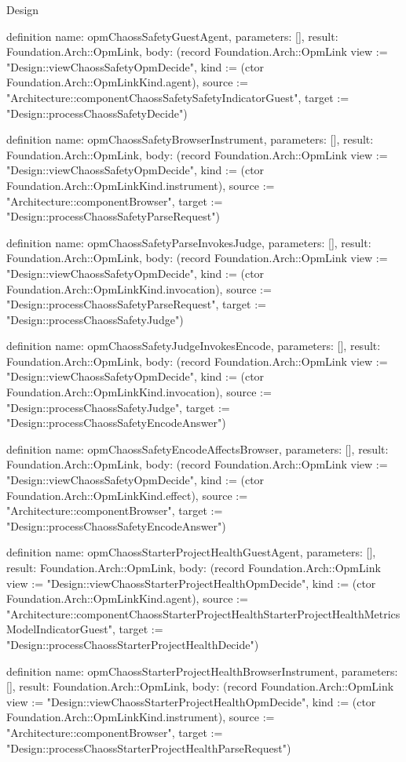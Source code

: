 \begin{lexlean}{Design}
\begin{semanticmodule}
definition{
  name: opmChaossSafetyGuestAgent,
  parameters: [],
  result: Foundation.Arch::OpmLink,
  body: (record Foundation.Arch::OpmLink {view := "Design::viewChaossSafetyOpmDecide", kind := (ctor Foundation.Arch::OpmLinkKind.agent), source := "Architecture::componentChaossSafetySafetyIndicatorGuest", target := "Design::processChaossSafetyDecide"})
}

definition{
  name: opmChaossSafetyBrowserInstrument,
  parameters: [],
  result: Foundation.Arch::OpmLink,
  body: (record Foundation.Arch::OpmLink {view := "Design::viewChaossSafetyOpmDecide", kind := (ctor Foundation.Arch::OpmLinkKind.instrument), source := "Architecture::componentBrowser", target := "Design::processChaossSafetyParseRequest"})
}

definition{
  name: opmChaossSafetyParseInvokesJudge,
  parameters: [],
  result: Foundation.Arch::OpmLink,
  body: (record Foundation.Arch::OpmLink {view := "Design::viewChaossSafetyOpmDecide", kind := (ctor Foundation.Arch::OpmLinkKind.invocation), source := "Design::processChaossSafetyParseRequest", target := "Design::processChaossSafetyJudge"})
}

definition{
  name: opmChaossSafetyJudgeInvokesEncode,
  parameters: [],
  result: Foundation.Arch::OpmLink,
  body: (record Foundation.Arch::OpmLink {view := "Design::viewChaossSafetyOpmDecide", kind := (ctor Foundation.Arch::OpmLinkKind.invocation), source := "Design::processChaossSafetyJudge", target := "Design::processChaossSafetyEncodeAnswer"})
}

definition{
  name: opmChaossSafetyEncodeAffectsBrowser,
  parameters: [],
  result: Foundation.Arch::OpmLink,
  body: (record Foundation.Arch::OpmLink {view := "Design::viewChaossSafetyOpmDecide", kind := (ctor Foundation.Arch::OpmLinkKind.effect), source := "Architecture::componentBrowser", target := "Design::processChaossSafetyEncodeAnswer"})
}

definition{
  name: opmChaossStarterProjectHealthGuestAgent,
  parameters: [],
  result: Foundation.Arch::OpmLink,
  body: (record Foundation.Arch::OpmLink {view := "Design::viewChaossStarterProjectHealthOpmDecide", kind := (ctor Foundation.Arch::OpmLinkKind.agent), source := "Architecture::componentChaossStarterProjectHealthStarterProjectHealthMetricsModelIndicatorGuest", target := "Design::processChaossStarterProjectHealthDecide"})
}

definition{
  name: opmChaossStarterProjectHealthBrowserInstrument,
  parameters: [],
  result: Foundation.Arch::OpmLink,
  body: (record Foundation.Arch::OpmLink {view := "Design::viewChaossStarterProjectHealthOpmDecide", kind := (ctor Foundation.Arch::OpmLinkKind.instrument), source := "Architecture::componentBrowser", target := "Design::processChaossStarterProjectHealthParseRequest"})
}


\end{semanticmodule}
\end{lexlean}
